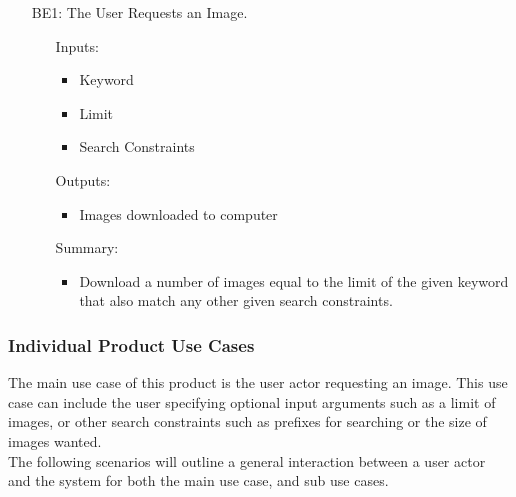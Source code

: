 \documentclass[12pt, titlepage]{article}
\begin{document}
\begin{enumerate}
    \item [BE1:] The User Requests an Image.
        \begin{itemize}[wide=0pt, leftmargin=*]
            \item [Inputs:] \phantom{empty}
                \begin{itemize} [wide=0pt, leftmargin=*]
                    \item Keyword
                    \item Limit
                    \item Search Constraints
                \end{itemize}
                
            \item [Outputs:] \phantom{empty}
                \begin{itemize} [wide=0pt, leftmargin=*]
                    \item Images downloaded to computer
                \end{itemize}
            \item [Summary:] \phantom{empty}
                \begin{itemize} [wide=0pt, leftmargin=*]
                    \item Download a number of images equal to the limit of the given keyword that also match any other given search constraints.
                \end{itemize}
        \end{itemize}
\end{enumerate}

\subsubsection{Individual Product Use Cases}

The main use case of this product is the user actor requesting an image. This use case can include the user specifying optional input arguments such as a limit of images, or other search constraints such as prefixes for searching or the size of images wanted.\\

\noindent The following scenarios will outline a general interaction between a user actor and the system for both the main use case, and sub use cases. 
\end{document}
